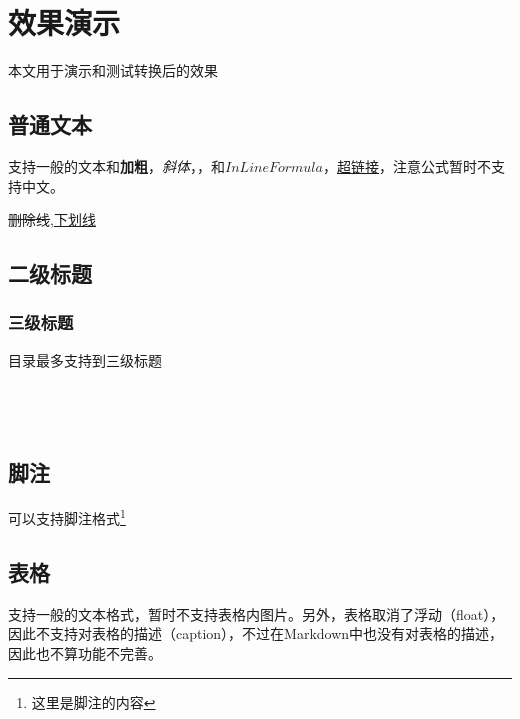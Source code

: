 \documentclass[UTF8]{ctexart}
\newenvironment{marktext}{}{}
\begin{document}
\begin{marktext}


\section{效果演示}




本文用于演示和测试转换后的效果


\subsection{普通文本}


支持一般的文本和\textbf{加粗}，\textit{斜体}，，和$InLine Formula$，\href{http://github.com}{超链接}，注意公式暂时不支持中文。


\sout{删除线},\underline{下划线}


\subsection{二级标题}




\subsubsection{三级标题}


目录最多支持到三级标题
\\\\
\\\\


\subsection{脚注}




可以支持脚注格式\footnote{这里是脚注的内容}






\subsection{表格}


支持一般的文本格式，暂时不支持表格内图片。另外，表格取消了浮动（float），因此不支持对表格的描述（caption），不过在Markdown中也没有对表格的描述，因此也不算功能不完善。


\end{marktext}
\end{document}
